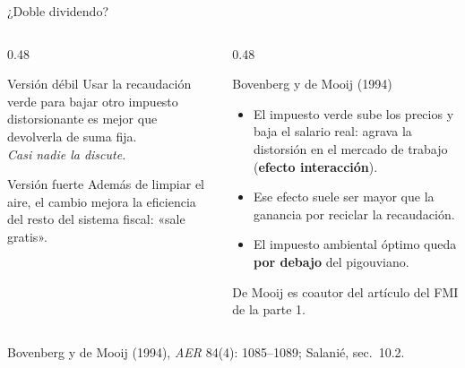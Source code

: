 \documentclass[aspectratio=169,11pt]{beamer}
\newcommand{\fuente}[1]{\par\vfill{\small\color{cGris}#1\par}}
\begin{document}
\begin{frame}{¿Doble dividendo?}
  \begin{columns}[T]
    \begin{column}{0.48\textwidth}
      \begin{block}{Versión débil}
        Usar la recaudación verde para bajar otro impuesto distorsionante es mejor que devolverla de suma fija.\\
        \emph{Casi nadie la discute.}
      \end{block}
      \begin{block}{Versión fuerte}
        Además de limpiar el aire, el cambio mejora la eficiencia del resto del sistema fiscal: «sale gratis».
      \end{block}
    \end{column}
    \begin{column}{0.48\textwidth}
      \pause
      \begin{alertblock}{Bovenberg y de Mooij (1994)}
        \begin{itemize}
          \item El impuesto verde sube los precios y baja el salario real: agrava la distorsión en el mercado de trabajo (\textbf{efecto interacción}).
          \item Ese efecto suele ser mayor que la ganancia por reciclar la recaudación.
          \item El impuesto ambiental óptimo queda \textbf{por debajo} del pigouviano.
        \end{itemize}
      \end{alertblock}
      \pause
      {\small De Mooij es coautor del artículo del FMI de la parte 1.}
    \end{column}
  \end{columns}
  \fuente{Bovenberg y de Mooij (1994), \emph{AER} 84(4): 1085--1089; Salanié, sec.~10.2.}
\end{frame}
\end{document}
